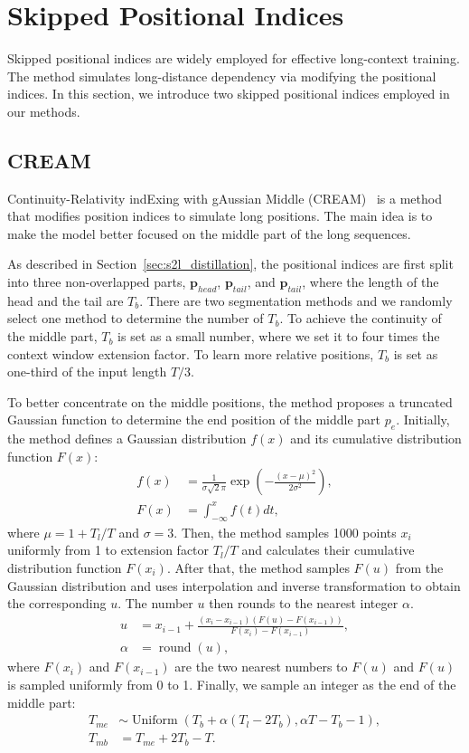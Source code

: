 



\section{Skipped Positional Indices}
\label{app:cream}

Skipped positional indices are widely employed for effective long-context training. The method simulates long-distance dependency via modifying the positional indices. In this section, we introduce two skipped positional indices employed in our methods.


\subsection{CREAM}
Continuity-Relativity indExing with gAussian Middle (CREAM)~\cite{wu-nips-2024-cream} is a method that modifies position indices to simulate long positions. The main idea is to make the model better focused on the middle part of the long sequences. 

As described in Section~\ref{sec:s2l_distillation}, the positional indices are first split into three non-overlapped parts, \ie $\bm p_{head}$, $\bm p_{tail}$, and $\bm p_{tail}$, where the length of the head and the tail are $T_b$. There are two segmentation methods and we randomly select one method to determine the number of $T_b$. To achieve the continuity of the middle part, $T_b$ is set as a small number, where we set it to four times the context window extension factor. To learn more relative positions, $T_b$ is set as one-third of the input length $T/3$. 

To better concentrate on the middle positions, the method proposes a truncated Gaussian function to determine the end position of the middle part $p_e$. Initially, the method defines a Gaussian distribution $f(x)$ and its cumulative distribution function $F(x)$:
\begin{align}
    f(x) &= \frac 1 {\sigma \sqrt 2\pi} \exp(-\frac {(x-\mu)^2}{2\sigma^2}), \\
    F(x) &= \int_{-\infty}^x f(t) dt,
\end{align}
where $\mu= 1+T_l/T$ and $\sigma=3$. Then, the method samples 1000 points $x_i$ uniformly from 1 to extension factor $T_l/T$ and calculates their cumulative distribution function $F(x_i)$. After that, the method samples $F(u)$ from the Gaussian distribution and uses interpolation and inverse transformation to obtain the corresponding $u$. The number $u$ then rounds to the nearest integer $\alpha$.
\begin{align}
    u &= x_{i-1} + \frac{(x_i-x_{i-1})(F(u)-F(x_{i-1}))}{F(x_i)-F(x_{i-1})},\\
    \alpha &= \operatorname{round}(u),
\end{align}
where $F(x_i)$ and $F(x_{i-1})$ are the two nearest numbers to $F(u)$ and $F(u)$ is sampled uniformly from 0 to 1. Finally, we sample an integer as the end of the middle part:
\begin{align}
    T_{me} &\sim \operatorname{Uniform}(T_b+\alpha (T_l-2T_b), \alpha T-T_b-1),\\
    T_{mb} &= T_{me}+2T_b-T.
\end{align}

